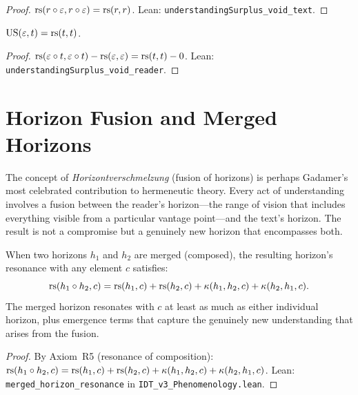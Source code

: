 \begin{proof}
$\mathrm{rs}(r \circ \varepsilon, r \circ \varepsilon) = \mathrm{rs}(r, r)$.
Lean: \texttt{understandingSurplus\_void\_text}.
\end{proof}

\begin{theorem}
\label{thm:us-void-reader}
$\mathrm{US}(\varepsilon, t) = \mathrm{rs}(t, t)$.
\end{theorem}

\begin{proof}
$\mathrm{rs}(\varepsilon \circ t, \varepsilon \circ t) - \mathrm{rs}(\varepsilon, \varepsilon) = \mathrm{rs}(t, t) - 0$.
Lean: \texttt{understandingSurplus\_void\_reader}.
\end{proof}




\section{Horizon Fusion and Merged Horizons}

The concept of \textit{Horizontverschmelzung} (fusion of horizons) is perhaps
Gadamer's most celebrated contribution to hermeneutic theory.  Every act of
understanding involves a fusion between the reader's horizon---the range of
vision that includes everything visible from a particular vantage point---and
the text's horizon.  The result is not a compromise but a genuinely new horizon
that encompasses both.

\begin{theorem}
\label{thm:merged-horizon}
When two horizons $h_1$ and $h_2$ are merged (composed), the resulting
horizon's resonance with any element $c$ satisfies:
\[
\mathrm{rs}(h_1 \circ h_2, c) = \mathrm{rs}(h_1, c) + \mathrm{rs}(h_2, c) + \kappa(h_1, h_2, c) + \kappa(h_2, h_1, c).
\]
The merged horizon resonates with $c$ at least as much as either individual horizon,
plus emergence terms that capture the genuinely new understanding that
arises from the fusion.
\end{theorem}

\begin{proof}
By Axiom~R5 (resonance of composition):
$\mathrm{rs}(h_1 \circ h_2, c) = \mathrm{rs}(h_1, c) + \mathrm{rs}(h_2, c) + \kappa(h_1, h_2, c) + \kappa(h_2, h_1, c)$.
Lean: \texttt{merged\_horizon\_resonance} in \texttt{IDT\_v3\_Phenomenology.lean}.
\end{proof}

